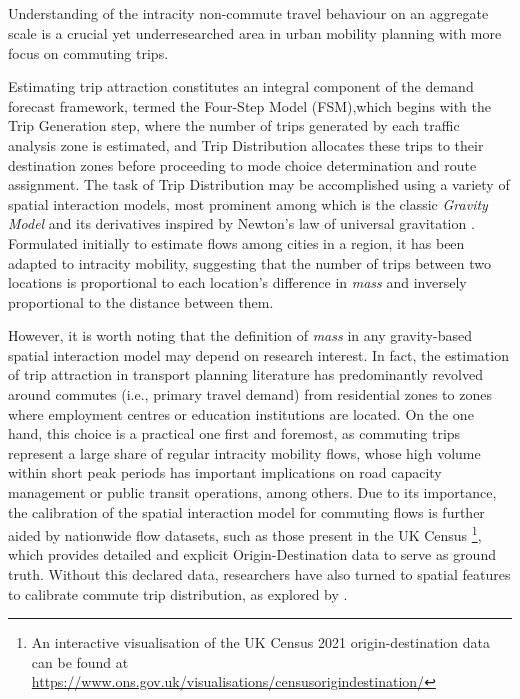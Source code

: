 
\subsection*{}

Understanding of the intracity non-commute travel behaviour on an aggregate scale is a crucial yet underresearched area in urban mobility planning with more focus on commuting trips.

Estimating trip attraction constitutes an integral component of the demand forecast framework, termed the Four-Step Model (FSM),which begins with the Trip Generation step, where the number of trips generated by each traffic analysis zone is estimated, and Trip Distribution allocates these trips to their destination zones before proceeding to mode choice determination and route assignment. The task of Trip Distribution may be accomplished using a variety of spatial interaction models, most prominent among which is the classic \textit{Gravity Model} and its derivatives inspired by Newton's law of universal gravitation \citep{erlanderGravityModelTransportation1990}. Formulated initially to estimate flows among cities in a region, it has been adapted to intracity mobility, suggesting that the number of trips between two locations is proportional to each location's difference in \textit{mass} and inversely proportional to the distance between them. 

However, it is worth noting that the definition of \textit{mass} in any gravity-based spatial interaction model may depend on research interest. In fact, the estimation of trip attraction in transport planning literature has predominantly revolved around commutes (i.e., primary travel demand) from residential zones to zones where employment centres or education institutions are located. On the one hand, this choice is a practical one first and foremost, as commuting trips represent a large share of regular intracity mobility flows, whose high volume within short peak periods has important implications on road capacity management or public transit operations, among others. Due to its importance, the calibration of the spatial interaction model for commuting flows is further aided by nationwide flow datasets, such as those present in the UK Census \footnote{An interactive visualisation of the UK Census 2021 origin-destination data can be found at \url{https://www.ons.gov.uk/visualisations/censusorigindestination/}}, which provides detailed and explicit Origin-Destination data to serve as ground truth. Without this declared data, researchers have also turned to spatial features to calibrate commute trip distribution, as explored by \cite{yangLimitsPredictabilityCommuting2014}.


